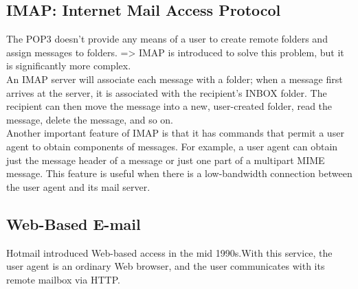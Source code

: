 \subsection{IMAP: Internet Mail Access Protocol}

\hf
The POP3 doesn't provide any means of a user to create remote folders and assign 
messages to folders. => IMAP is introduced to solve this problem, but it is significantly
more complex.\\

An IMAP server will associate each message with a folder; when a message first
arrives at the server, it is associated with the recipient’s INBOX folder. The recipient
can then move the message into a new, user-created folder, read the message, delete
the message, and so on.\\

Another important feature of IMAP is that it has commands that permit a user
agent to obtain components of messages. For example, a user agent can obtain just
the message header of a message or just one part of a multipart MIME message.
This feature is useful when there is a low-bandwidth connection between the user agent and its mail server.


\subsection{Web-Based E-mail}

\hf
Hotmail introduced Web-based access in the mid 1990s.With this service, the user agent is an ordinary Web browser,
and the user communicates with its remote mailbox via HTTP.